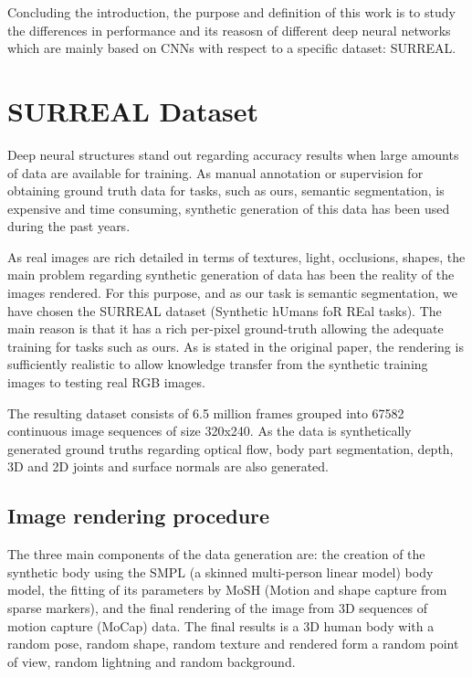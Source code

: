 \documentclass[12pt,a4paper]{article}
\begin{document}
Concluding the introduction, the purpose and definition of this work is to study the differences in performance  and its reasosn of different deep neural networks which are mainly based on CNNs with respect to a specific dataset: SURREAL. \\

\newpage
\section{SURREAL Dataset}

Deep neural structures stand out regarding accuracy results when large amounts of data are available for training. As manual annotation or supervision for obtaining ground truth data for tasks, such as ours, semantic segmentation, is expensive and time consuming, synthetic generation of this data has been used during the past years.\newline

As real images are rich detailed in terms of textures, light, occlusions, shapes, the main problem regarding synthetic generation of data has been the reality of the images rendered. For this purpose, and as our task is semantic segmentation, we have chosen the SURREAL dataset (Synthetic hUmans foR REal tasks). The main reason is that it has a rich per-pixel ground-truth  allowing the adequate training for tasks such as ours. As is stated in the original paper, the rendering is sufficiently realistic to allow knowledge transfer from the synthetic training images to testing real RGB images. \newline

The resulting dataset consists of 6.5 million frames grouped into 67582 continuous image sequences of size 320x240. As the data is synthetically generated ground truths regarding optical flow, body part segmentation, depth, 3D and 2D joints and surface normals are also generated.
 
\subsection{Image rendering procedure}

The three main components of the data generation are: the creation of the synthetic body using the SMPL (a skinned multi-person linear model) body model, the fitting of its parameters by MoSH (Motion and shape capture from sparse markers), and the final rendering of the image from 3D sequences of motion capture (MoCap) data. The final results is a 3D human body with a random pose, random shape, random texture and rendered form a random point of view, random lightning and random background.\newline
\end{document}

